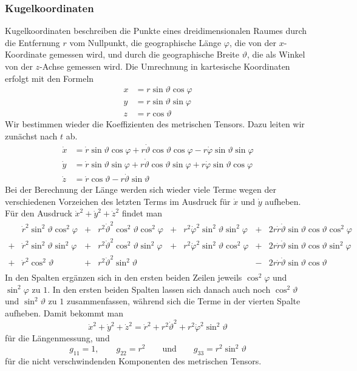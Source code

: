 \subsubsection{Kugelkoordinaten}
Kugelkoordinaten beschreiben die Punkte eines dreidimensionalen Raumes
durch die Entfernung $r$ vom Nullpunkt, die geographische Länge
$\varphi$, die von
der $x$-Koordinate gemessen wird, und durch die geographische Breite
$\vartheta$,
die als Winkel von der $z$-Achse gemessen wird.
Die Umrechnung in kartesische Koordinaten erfolgt mit den Formeln
\begin{align*}
x&= r\sin\vartheta\cos\varphi\\
y&= r\sin\vartheta\sin\varphi\\
z&= r\cos\vartheta
\end{align*}
Wir bestimmen wieder die Koeffizienten des metrischen Tensors.
Dazu leiten wir zunächst nach $t$ ab.
\begin{align*}
\dot x
&=
\dot r\sin\vartheta\cos\varphi
+
r\dot\vartheta \cos\vartheta\cos\varphi
-
r\dot\varphi \sin\vartheta\sin\varphi
\\
\dot y
&=
\dot r\sin\vartheta\sin\varphi
+
r\dot\vartheta\cos\vartheta\sin\varphi
+
r\dot\varphi\sin\vartheta\cos\varphi
\\
\dot z
&=
\dot r\cos\vartheta
-
r\dot\vartheta \sin\vartheta
\end{align*}
Bei der Berechnung der Länge werden sich wieder viele Terme
wegen der verschiedenen Vorzeichen des letzten Terms im
Ausdruck für $\dot x$ und $\dot y$ aufheben.
Für den Ausdruck $ \dot x^2 + \dot y^2 + \dot z^2$ findet man
\[
\begin{array}{clclclcl}
 &
\dot r^2\sin^2\vartheta\cos^2\varphi
	&+&r^2\dot\vartheta^2\cos^2\vartheta\cos^2\varphi
		&+&r^2\dot\varphi^2\sin^2\vartheta\sin^2\varphi
			&+&2r\dot r\dot\vartheta\sin\vartheta\cos\vartheta\cos^2\varphi
\\
+&
\dot r^2\sin^2\vartheta\sin^2\varphi
	&+&r^2\dot\vartheta^2\cos^2\vartheta\sin^2\varphi
		&+&r^2\dot\varphi^2\sin^2\vartheta\cos^2\varphi
			&+&2r\dot r\dot\vartheta\sin\vartheta\cos\vartheta\sin^2\varphi
\\
+&
\dot r^2\cos^2\vartheta
	&+&r^2\dot\vartheta^2\sin^2\vartheta
		& &
			&-&2r\dot r\dot\vartheta \sin\vartheta \cos\vartheta
\\
\end{array}
\]
In den Spalten ergänzen sich in den ersten beiden Zeilen jeweils
$\cos^2\varphi$ und $\sin^2\varphi$ zu $1$.
In den ersten beiden Spalten lassen sich danach auch noch
$\cos^2\vartheta$ und $\sin^2\vartheta$ zu $1$ zusammenfassen,
während sich die Terme in der vierten Spalte aufheben.
Damit bekommt man
\begin{equation}
\dot x^2 + \dot y^2 + \dot z^2
=
\dot r^2+r^2\dot\vartheta^2 + r^2\dot\varphi^2\sin^2\vartheta
\label{skript:kruemmung:kugelkoordinaten}
\end{equation}
für die Längenmessung, und
\[
g_{11}=1,\qquad
g_{22}=r^2
\qquad\text{und}\qquad
g_{33}= r^2\sin^2\vartheta
\]
für die nicht verschwindenden Komponenten des metrischen Tensors.

